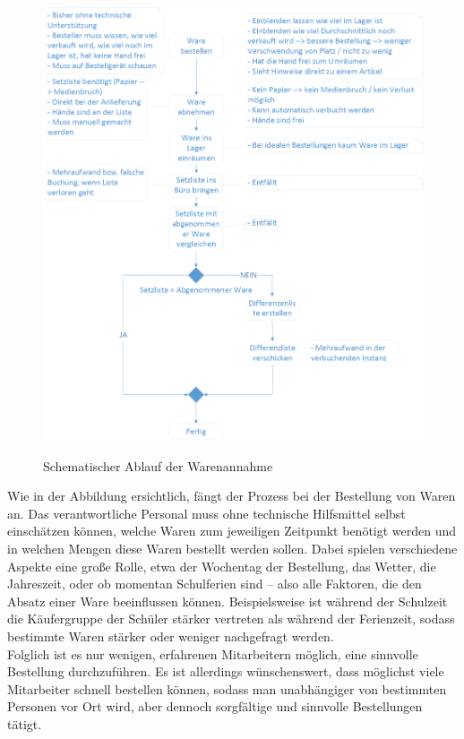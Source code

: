 \begin{figure}[H]
	\centering
	{\includegraphics[width=\textwidth]{Bilder/Abbildungen/Warenannahme_Vergleich.png}}
	\caption{Schematischer Ablauf der Warenannahme}
	\label{fig:warenannahme_vergleich}
\end{figure}

Wie in der Abbildung ersichtlich, fängt der Prozess bei der Bestellung von Waren an. Das verantwortliche Personal muss ohne technische Hilfsmittel selbst einschätzen können, welche Waren zum jeweiligen Zeitpunkt benötigt werden und in welchen Mengen diese Waren bestellt werden sollen. Dabei spielen verschiedene Aspekte eine große Rolle, etwa der Wochentag der Bestellung, das Wetter, die Jahreszeit, oder ob momentan Schulferien sind -- also alle Faktoren, die den Absatz einer Ware beeinflussen können. Beispielsweise ist während der Schulzeit die Käufergruppe der Schüler stärker vertreten als während der Ferienzeit, sodass bestimmte Waren stärker oder weniger nachgefragt werden.\\
Folglich ist es nur wenigen, erfahrenen Mitarbeitern möglich, eine sinnvolle Bestellung durchzuführen. Es ist allerdings wünschenswert, dass möglichst viele Mitarbeiter schnell bestellen können, sodass man unabhängiger von bestimmten Personen vor Ort wird, aber dennoch sorgfältige und sinnvolle Bestellungen tätigt.\\

